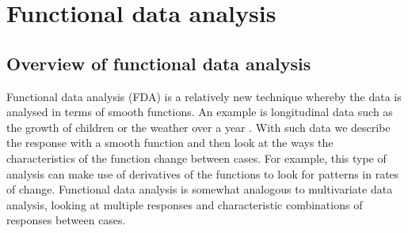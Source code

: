 


\section{Functional data analysis}
\subsection{Overview of functional data analysis}
Functional data analysis (FDA) is a relatively new technique whereby the data is analysed in terms of smooth functions. An example is longitudinal data such as the growth of children or the weather over a year \cite{ramsay}. With such data we describe the response with a smooth function and then look at the ways the characteristics of the function change between cases. For example, this type of analysis can make use of derivatives of the functions to look for patterns in rates of change. Functional data analysis is somewhat analogous to multivariate data analysis, looking at multiple responses and characteristic combinations of responses between cases.

